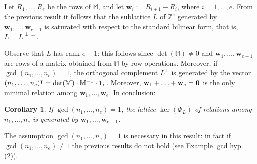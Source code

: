 \documentclass[11pt,twoside]{amsart}
\newcommand{\Z}{\mathbb Z}
\newcommand{\MM}{\mathbb M}
\def\bw{{\mathbf w}}
\def\bbM{{\mathbb M}}
\newtheorem{cor}[Theorem]{Corollary}
\theoremstyle{definition}
\numberwithin{equation}{section}
\begin{document}
Let $R_1,\ldots,R_e$ be the rows of $\bbM$, and let $\bw_i := R_{i+1}-R_{i}$, where $i=1,\ldots,e$. From the previous result it follows that the sublattice $L$ of $\Z^e$ generated by $\bw_1, \ldots, \bw_{e-1}$ is saturated with respect to the standard bilinear form, that is, $L = L^{\perp\perp}$.

Observe that $L$ has rank $e-1$: this follows  since $\det(\MM) \ne 0$
and $\bw_1, \ldots, \bw_{e-1}$  are rows of a matrix obtained from $\MM$ by row operations. Moreover, if $\gcd(n_1,\ldots,n_e)=1$, the orthogonal complement $L^\perp$ is generated by the vector $(n_1, \ldots, n_e)^\intercal = \det(\MM) \cdot \MM^{-1}\cdot {\bf 1}_e$. Moreover, $\bw_1+\ldots+\bw_e={\bf 0}$ is the only minimal relation among $\bw_1,\ldots,\bw_e$. In conclusion:
\begin{cor}\label{latticegen}
If $\gcd(n_1,\ldots,n_e)=1$, the lattice $\ker(\Phi_L)$ of relations among $n_1, \ldots, n_e$
is generated by $\bw_1, \ldots, \bw_{e-1}$.
\end{cor}

The assumption $\gcd(n_1,\ldots,n_e)=1$ is necessary in this result: in fact if $\gcd(n_1,\ldots,n_e) \ne 1$ the previous results do not hold (see Example \ref{gcd hyp} (2)).
\end{document}

